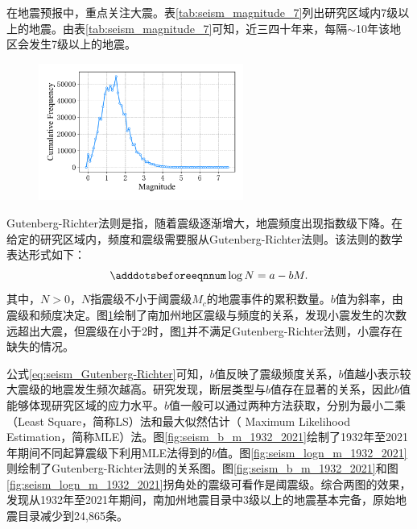 在地震预报中，重点关注大震。表\ref{tab:seism_magnitude_7}列出研究区域内7级以上的地震。由表\ref{tab:seism_magnitude_7}可知，近三四十年来，每隔$\sim$10年该地区会发生7级以上的地震。

\begin{figure}[!htbp]
  \centering
  \includegraphics[width=0.60\textwidth]{Img/chap5_seism/seism_m_f.pdf}
  \vspace{-0.5cm}
  \label{fig:seism_m_f}
\end{figure}

Gutenberg-Richter法则是指，随着震级逐渐增大，地震频度出现指数级下降\citep{Asim2018Earthquake}。在给定的研究区域内，频度和震级需要服从Gutenberg-Richter法则\citep{Gutenberg1994Frequency}。该法则的数学表达形式如下：
\begin{equation}\adddotsbeforeeqnnum
  \label{eq:seism_Gutenberg-Richter}
  \log N=a-bM.
\end{equation}
其中，$N>0$，$N$指震级不小于阈震级$M_c$的地震事件的累积数量。$b$值为斜率，由震级和频度决定。图\ref{fig:seism_m_f}绘制了南加州地区震级与频度的关系，发现小震发生的次数远超出大震，但震级在小于2时，图\ref{fig:seism_m_f}并不满足Gutenberg-Richter法则，小震存在缺失的情况。

公式\ref{eq:seism_Gutenberg-Richter}可知，$b$值反映了震级频度关系，$b$值越小表示较大震级的地震发生频次越高。\citet{schorlemmer2005variations}研究发现，断层类型与$b$值存在显著的关系，因此$b$值能够体现研究区域的应力水平。$b$值一般可以通过两种方法获取，分别为最小二乘（Least Square，简称LS）法和最大似然估计（ Maximum Likelihood Estimation，简称MLE）法。图\ref{fig:seism_b_m_1932_2021}绘制了1932年至2021年期间不同起算震级下利用MLE法得到的$b$值。图\ref{fig:seism_logn_m_1932_2021}则绘制了Gutenberg-Richter法则的关系图。图\ref{fig:seism_b_m_1932_2021}和图\ref{fig:seism_logn_m_1932_2021}拐角处的震级可看作是阈震级。综合两图的效果，发现从1932年至2021年期间，南加州地震目录中3级以上的地震基本完备，原始地震目录减少到24,865条。


